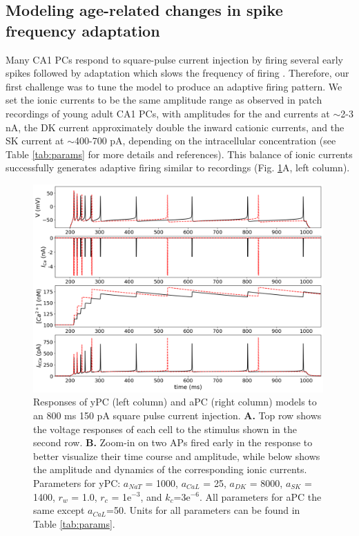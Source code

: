 \documentclass[12pt]{article}
\begin{document}
\subsection{Modeling age-related changes in spike frequency adaptation}
\label{sec:adaptation}

Many CA1 PCs respond to square-pulse current injection by firing several early spikes followed by adaptation which slows the frequency of firing \citep{gant2006early,madison1984control,stackman2002small,borde1995activity,gu2008sk,jung2009biphasic,kim2005kv4,malik2012enhanced}. 
Therefore, our first challenge was to tune the model to produce an adaptive firing pattern. 
We set the ionic currents to be the same amplitude range as observed in patch recordings of young adult CA1 PCs, with amplitudes for the {\Na} and {\Ca} currents at $\sim$2-3 nA, the DK current approximately double the inward cationic currents, and the SK current at $\sim$400-700 pA, depending on the intracellular {\Ca} concentration (see Table \ref{tab:params} for more details and references). This balance of ionic currents successfully generates adaptive firing similar to recordings (Fig. \ref{fig:adaptation}A, left column).

\begin{figure}[h!]
    \centering
     \includegraphics[width=0.99\textwidth]{figures/fig1.png} 
    \caption{Responses of yPC (left column) and aPC (right column)  models to an 800 ms 150 pA square pulse current injection. \textbf{A.} Top row shows the voltage responses of each cell to the stimulus shown in the second row. \textbf{B.} Zoom-in on two APs fired early in the response to better visualize their time course and amplitude, while below shows the amplitude and dynamics of the corresponding ionic currents. Parameters for yPC: $a_{NaT}$ = 1000, $a_{CaL}$ = 25, $a_{DK}$ = 8000, $a_{SK}$ = 1400, $r_{w}$ = 1.0, $r_{c}$ = 1e$^{-3}$, and $k_{c}$=3e$^{-6}$. All parameters for aPC the same except $a_{CaL}$=50. Units for all parameters can be found in Table \ref{tab:params}.}
    \label{fig:adaptation}
\end{figure}
\end{document}
